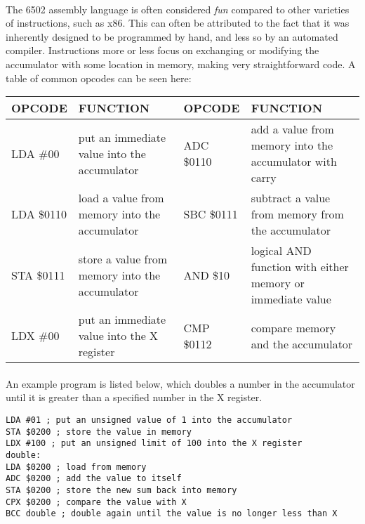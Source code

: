 \documentclass{article}
\begin{document}
\paragraph{}
The 6502 assembly language is often considered \textit{fun} compared to other varieties of instructions, such as x86. This can often be attributed to the fact that it was inherently designed to be programmed by hand, and less so by an automated compiler. Instructions more or less focus on exchanging or modifying the accumulator with some location in memory, making very straightforward code. A table of common opcodes can be seen here:
    \begin{center}
    \begin{tabular}{|p{2cm}|p{5cm}|p{2cm}|p{5cm}|}
    \hline
    OPCODE & FUNCTION                                       & OPCODE & FUNCTION                                                   \\ \hline
    LDA \#00       & put an immediate value into the accumulator    & ADC \$0110     & add a value from memory into the accumulator with carry    \\ \hline
    LDA \$0110     & load a value from memory into the accumulator  & SBC \$0111     & subtract a value from memory from the accumulator          \\ \hline
    STA \$0111     & store a value from memory into the accumulator & AND \$10       & logical AND function with either memory or immediate value \\ \hline
    LDX \#00       & put an immediate value into the X register     & CMP \$0112     & compare memory and the accumulator                         \\ \hline
    \end{tabular}
    \end{center}

\paragraph{}
An example program is listed below, which doubles a number in the accumulator until it is greater than a specified number in the X register.

\begin{lstlisting}
LDA #01 ; put an unsigned value of 1 into the accumulator
STA $0200 ; store the value in memory
LDX #100 ; put an unsigned limit of 100 into the X register
double: 
LDA $0200 ; load from memory
ADC $0200 ; add the value to itself
STA $0200 ; store the new sum back into memory
CPX $0200 ; compare the value with X
BCC double ; double again until the value is no longer less than X
\end{lstlisting}
\end{document}
